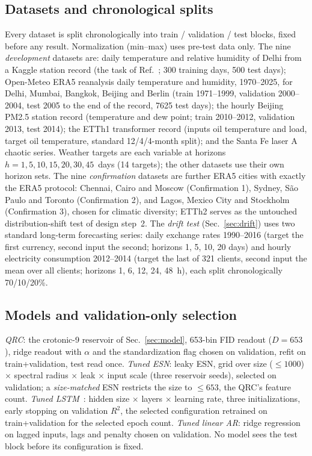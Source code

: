 \documentclass[aps,prresearch,preprint,superscriptaddress,amsmath,amssymb,floatfix]{revtex4-2}
\begin{document}
\subsection{Datasets and chronological splits}
Every dataset is split chronologically into train / validation / test blocks, fixed
before any result. Normalization (min--max) uses pre-test data only. The nine
\emph{development} datasets are: daily temperature and relative humidity of Delhi from
a Kaggle station record (the task of Ref.~\cite{Hou2026}; 300 training days, 500 test
days); Open-Meteo ERA5 reanalysis daily temperature and humidity, 1970--2025, for Delhi,
Mumbai, Bangkok, Beijing and Berlin (train 1971--1999, validation 2000--2004, test 2005
to the end of the record, 7625 test days); the hourly Beijing PM2.5 station record
(temperature and dew point; train 2010--2012, validation 2013, test 2014); the ETTh1
transformer record (inputs oil temperature and load, target oil temperature, standard
12/4/4-month split); and the Santa Fe laser A chaotic series. Weather targets are each
variable at horizons $h=1,5,10,15,20,30,45$~days (14 targets); the other datasets use
their own horizon sets. %
The nine \emph{confirmation} datasets are further ERA5 cities with exactly the ERA5
protocol: Chennai, Cairo and Moscow (Confirmation 1), Sydney, S\~{a}o Paulo and
Toronto (Confirmation 2), and Lagos, Mexico City and Stockholm (Confirmation 3), chosen
for climatic diversity; ETTh2 serves as the untouched distribution-shift test of design
step~2. The \emph{drift test} (Sec.~\ref{sec:drift}) uses two standard long-term
forecasting series: daily exchange rates 1990--2016 (target the first currency, second
input the second; horizons 1, 5, 10, 20 days) and hourly electricity consumption
2012--2014 (target the last of 321 clients, second input the mean over all clients;
horizons 1, 6, 12, 24, 48~h), each split chronologically 70/10/20\%.

\subsection{Models and validation-only selection}
\emph{QRC}: the crotonic-9 reservoir of Sec.~\ref{sec:model}, 653-bin FID readout
($D=653$), ridge readout with $\alpha$ and the standardization flag chosen on
validation, refit on train+validation, test read once. \emph{Tuned ESN}: leaky ESN, grid
over size ($\le1000$) $\times$ spectral radius $\times$ leak $\times$ input scale
(three reservoir seeds), selected on validation; a \emph{size-matched} ESN restricts
the size to $\le653$, the QRC's feature count. \emph{Tuned LSTM}~\cite{Hochreiter1997}:
hidden size $\times$ layers $\times$ learning rate, three initializations, early
stopping on validation $R^2$, the selected configuration retrained on train+validation
for the selected epoch count. \emph{Tuned linear AR}: ridge regression on lagged
inputs, lags and penalty chosen on validation. No model sees the test block before its
configuration is fixed.
\end{document}
